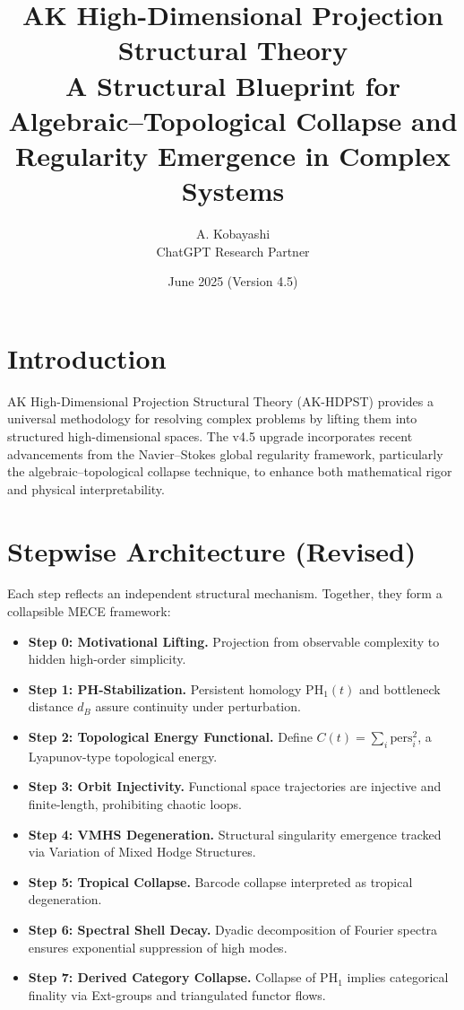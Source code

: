 \documentclass[11pt]{article}
\title{AK High-Dimensional Projection Structural Theory\\
\large A Structural Blueprint for Algebraic--Topological Collapse and Regularity Emergence in Complex Systems}
\author{A. Kobayashi \\ ChatGPT Research Partner}
\date{June 2025 (Version 4.5)}
\begin{document}
\maketitle

\section{Introduction}
AK High-Dimensional Projection Structural Theory (AK-HDPST) provides a universal methodology for resolving complex problems by lifting them into structured high-dimensional spaces. The v4.5 upgrade incorporates recent advancements from the Navier--Stokes global regularity framework, particularly the algebraic--topological collapse technique, to enhance both mathematical rigor and physical interpretability.

\section{Stepwise Architecture (Revised)}
Each step reflects an independent structural mechanism. Together, they form a collapsible MECE framework:

\begin{itemize}
    \item \textbf{Step 0: Motivational Lifting.} Projection from observable complexity to hidden high-order simplicity.
    \item \textbf{Step 1: PH-Stabilization.} Persistent homology $\mathrm{PH}_1(t)$ and bottleneck distance $d_B$ assure continuity under perturbation.
    \item \textbf{Step 2: Topological Energy Functional.} Define $C(t) = \sum_i \mathrm{pers}_i^2$, a Lyapunov-type topological energy.
    \item \textbf{Step 3: Orbit Injectivity.} Functional space trajectories are injective and finite-length, prohibiting chaotic loops.
    \item \textbf{Step 4: VMHS Degeneration.} Structural singularity emergence tracked via Variation of Mixed Hodge Structures.
    \item \textbf{Step 5: Tropical Collapse.} Barcode collapse interpreted as tropical degeneration.
    \item \textbf{Step 6: Spectral Shell Decay.} Dyadic decomposition of Fourier spectra ensures exponential suppression of high modes.
    \item \textbf{Step 7: Derived Category Collapse.} Collapse of $\mathrm{PH}_1$ implies categorical finality via Ext-groups and triangulated functor flows.
\end{itemize}
\end{document}
